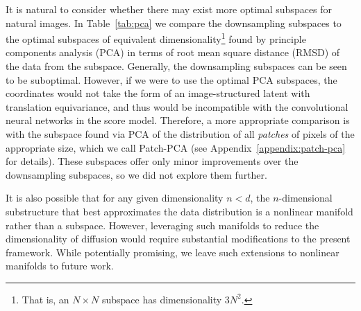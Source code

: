 \documentclass{article}
\begin{document}
It is natural to consider whether there may exist more optimal subspaces for natural images. In Table~\ref{tab:pca} we compare the downsampling subspaces to the optimal subspaces of equivalent dimensionality\footnote{That is, an $N \times N$ subspace has dimensionality $3N^2$.} found by principle components analysis (PCA) in terms of root mean square distance (RMSD) of the data from the subspace. Generally, the downsampling subspaces can be seen to be suboptimal. However, if we were to use the optimal PCA subspaces, the coordinates would not take the form of an image-structured latent with translation equivariance, and thus would be incompatible with the convolutional neural networks in the score model. Therefore, a more appropriate comparison is with the subspace found via PCA of the distribution of all \emph{patches} of pixels of the appropriate size, which we call Patch-PCA (see Appendix~\ref{appendix:patch-pca} for details). These subspaces offer only minor improvements over the downsampling subspaces, so we did not explore them further.

It is also possible that for any given dimensionality $n < d$, the $n$-dimensional substructure that best approximates the data distribution is a nonlinear manifold rather than a subspace. However, leveraging such manifolds to reduce the dimensionality of diffusion would require substantial modifications to the present framework. While potentially promising, we leave such extensions to nonlinear manifolds to future work.
\end{document}
